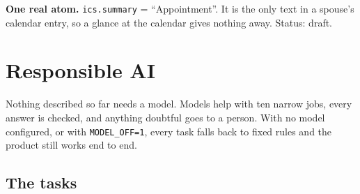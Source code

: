 \documentclass[10.5pt,a4paper]{article}
\newcommand{\chapterbreak}{}
\let\oldsection\section
\renewcommand{\section}{\chapterbreak\oldsection}
\newcommand{\code}[1]{\texttt{\small #1}}
\begin{document}
\begin{note}
\textbf{One real atom.} \code{ics.summary} = ``Appointment''. It is the only text in a spouse's calendar entry, so a
glance at the calendar gives nothing away. Status: draft.
\end{note}

\section{Responsible AI}

Nothing described so far needs a model. Models help with ten narrow jobs, every answer is checked, and anything
doubtful goes to a person. With no model configured, or with \code{MODEL\_OFF=1}, every task falls back to fixed rules
and the product still works end to end.

\subsection{The tasks}
\end{document}
